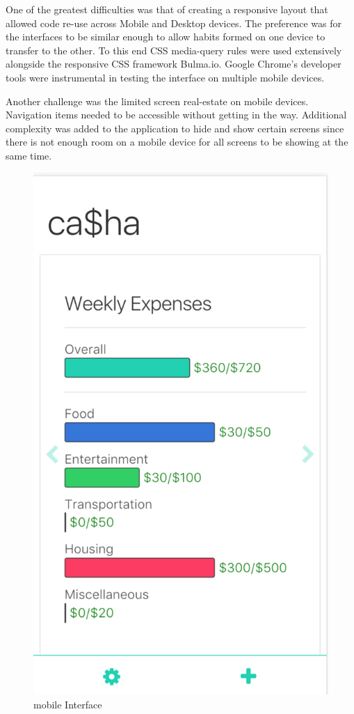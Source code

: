 \documentclass{chi2011}
\begin{document}
    One of the greatest difficulties was that of creating a responsive
    layout that allowed code re-use across Mobile and Desktop devices. The
    preference was for the interfaces to be similar enough to allow habits
    formed on one device to transfer to the other. To this end CSS media-query
    rules were used extensively alongside the responsive CSS framework
    Bulma.io. Google Chrome's developer tools were instrumental in testing
    the interface on multiple mobile devices.

    Another challenge was the limited screen real-estate on mobile devices.
    Navigation items needed to be accessible without getting in the way.
    Additional complexity was added to the application to hide and show certain
    screens since there is not enough room on a mobile device for all screens
    to be showing at the same time.

	\begin{figure}[h!]
		\caption{mobile Interface}
		\includegraphics[scale=0.5]{mobile-charts.png}
	\end{figure}
\end{document}
